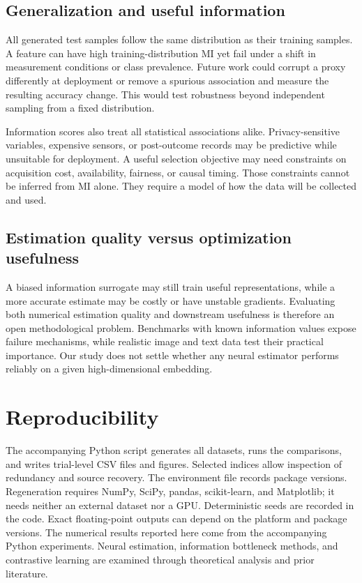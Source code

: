 \documentclass[journal,11pt]{IEEEtran}
\begin{document}
\subsection{Generalization and useful information}
All generated test samples follow the same distribution as their training samples. A feature can have high training-distribution MI yet fail under a shift in measurement conditions or class prevalence. Future work could corrupt a proxy differently at deployment or remove a spurious association and measure the resulting accuracy change. This would test robustness beyond independent sampling from a fixed distribution.

Information scores also treat all statistical associations alike. Privacy-sensitive variables, expensive sensors, or post-outcome records may be predictive while unsuitable for deployment. A useful selection objective may need constraints on acquisition cost, availability, fairness, or causal timing. Those constraints cannot be inferred from MI alone. They require a model of how the data will be collected and used.

\subsection{Estimation quality versus optimization usefulness}
A biased information surrogate may still train useful representations, while a more accurate estimate may be costly or have unstable gradients. Evaluating both numerical estimation quality and downstream usefulness is therefore an open methodological problem. Benchmarks with known information values expose failure mechanisms, while realistic image and text data test their practical importance. Our study does not settle whether any neural estimator performs reliably on a given high-dimensional embedding.

\section{Reproducibility}
The accompanying Python script generates all datasets, runs the comparisons, and writes trial-level CSV files and figures. Selected indices allow inspection of redundancy and source recovery. The environment file records package versions. Regeneration requires NumPy, SciPy, pandas, scikit-learn, and Matplotlib; it needs neither an external dataset nor a GPU. Deterministic seeds are recorded in the code. Exact floating-point outputs can depend on the platform and package versions. The numerical results reported here come from the accompanying Python experiments. Neural estimation, information bottleneck methods, and contrastive learning are examined through theoretical analysis and prior literature.
\end{document}
